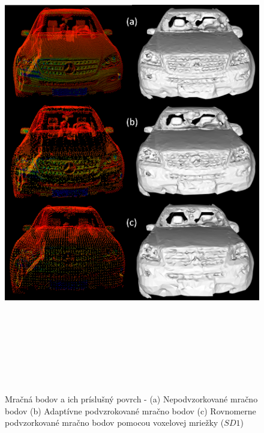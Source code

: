 \newpage\vfill
\begin{figure}[!htbp]
  \centering
  \includegraphics[width=16cm, height=21cm]{img/adaptive_comparison.png}
  \caption{Mračná bodov a ich príslušný povrch - (a) Nepodvzorkované mračno bodov (b) Adaptívne podvzrokované mračno bodov (c) Rovnomerne podvzorkované mračno bodov pomocou voxelovej mriežky ($SD1$)} 
  \label{fig:adaptive_comparison}
\end{figure}
\vfill\clearpage 


